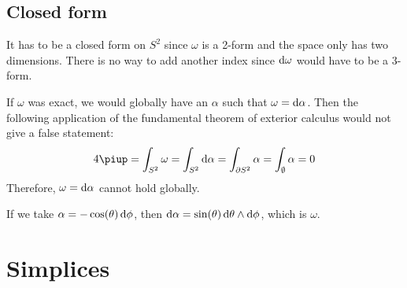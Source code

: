 \documentclass[11pt, english, fleqn, DIV=15, headinclude, BCOR=1cm]{scrartcl}
\begin{document}
\subsection{Closed form}

It has to be a closed form on $S^2$ since $\omega$ is a 2-form and the space
only has two dimensions. There is no way to add another index since $\mathop{}\!\mathrm d
\omega$ would have to be a 3-form.

If $\omega$ was exact, we would globally have an $\alpha$ such that $\omega =
\mathop{}\!\mathrm d\alpha$. Then the following application of the fundamental theorem of
exterior calculus would not give a false statement:
\[
    4 \piup = \int_{S^2} \omega = \int_{S^2} \dif \alpha = \int_{\partial S^2}
    \alpha = \int_\emptyset \alpha = 0
\]
Therefore, $\omega = \mathop{}\!\mathrm d\alpha$ cannot hold globally.

If we take $\alpha = - \cos(\theta) \mathop{}\!\mathrm d \phi$, then $\mathop{}\!\mathrm d \alpha =
\sin(\theta) \mathop{}\!\mathrm d \theta \wedge \mathop{}\!\mathrm d \phi$, which is $\omega$.

\section{Simplices}
\label{homework:3}
\end{document}
